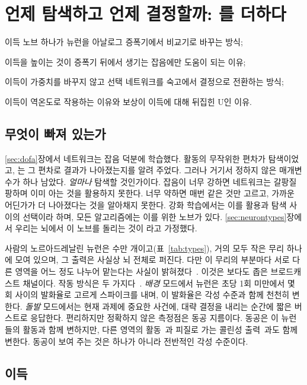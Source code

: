 \chapter{언제 탐색하고 언제 결정할까: 를 더하다}
\label{sec:nora}
\begin{chaptergoals}
\item 이득 노브 하나가 뉴런을 아날로그 증폭기에서 비교기로 바꾸는 방식;
\item 이득을 높이는 것이 증폭기 뒤에서 생기는 잡음에만 도움이 되는 이유;
\item 이득이 가중치를 바꾸지 않고 선택 네트워크를 숙고에서 결정으로 전환하는 방식;
\item 이득이 역온도로 작용하는 이유와 보상이 이득에 대해 뒤집힌 U인 이유.
\end{chaptergoals}

\section{무엇이 빠져 있는가}

\ref{sec:dofa}장에서 네트워크는 잡음 덕분에 학습했다. 활동의 무작위한 편차가 탐색이었고, 는 그 편차로 결과가 나아졌는지를 알려 주었다. 그러나 거기서 정하지 않은 매개변수가 하나 남았다. \emph{얼마나} 탐색할 것인가이다. 잡음이 너무 강하면 네트워크는 갈팡질팡하며 이미 아는 것을 활용하지 못한다. 너무 약하면 매번 같은 것만 고르고, 가까운 어딘가가 더 나아졌다는 것을 알아채지 못한다. 강화 학습에서는 이를 활용과 탐색 사이의 선택이라 하며, 모든 알고리즘에는 이를 위한 노브가 있다. \ref{sec:neurontypes}장에서 우리는 뇌에서 이 노브를 돌리는 것이 라고 가정했다.

사람의 노르아드레날린 뉴런은 수만 개이고(표~\ref{tab:types}), 거의 모두 작은 무리 하나에 모여 있으며, 그 출력은 사실상 뇌 전체로 퍼진다. 다만 이 무리의 부분마다 서로 다른 영역을 어느 정도 나누어 맡는다는 사실이 밝혀졌다~\cite{Poe2020}. 이것은 보다도 좁은 브로드캐스트 채널이다. 작동 방식은 두 가지다~\cite{AstonJones2005}. \emph{배경} 모드에서 뉴런은 초당 1회 미만에서 몇 회 사이의 발화율로 고르게 스파이크를 내며, 이 발화율은 각성 수준과 함께 천천히 변한다. \emph{돌발} 모드에서는 현재 과제에 중요한 사건에, 대략 결정을 내리는 순간에 짧은 버스트로 응답한다. 편리하지만 정확하지 않은 측정점은 동공 지름이다. 동공은 이 뉴런들의 활동과 함께 변하지만, 다른 영역의 활동~\cite{Joshi2016}과 피질로 가는 콜린성 출력~\cite{Reimer2016}과도 함께 변한다. 동공이 보여 주는 것은  하나가 아니라 전반적인 각성 수준이다.

\section{이득}

